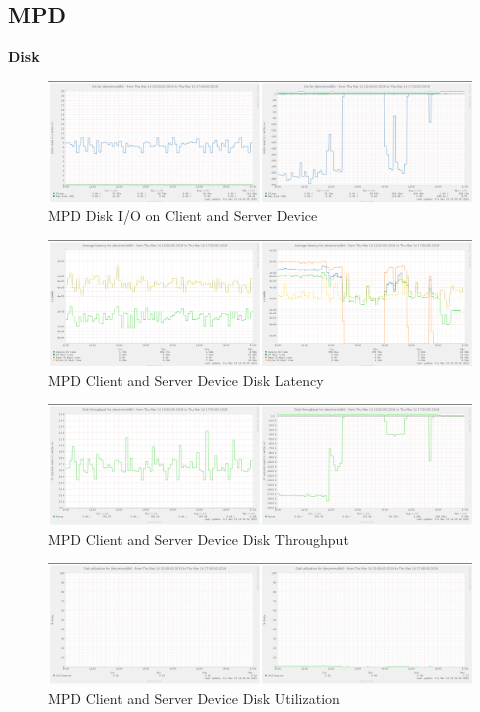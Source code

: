 \documentclass[11pt,a4paper]{scrreprt}
\begin{document}
\subsection{MPD}\label{mpd-2}

\textbf{Disk}

\begin{figure}[H]
\includegraphics{ResultsAndAnalysis/MPDServerTestImages/005MPDDiskIO.png}
\centering
\caption{MPD Disk I/O on Client and Server Device}
\label{MPDDiskIO}
\end{figure}

\begin{figure}[H]
\includegraphics{ResultsAndAnalysis/MPDServerTestImages/006MPDDiskLatency.png}
\centering
\caption{MPD Client and Server Device Disk Latency}
\label{MPDDiskLatency}
\end{figure}

\begin{figure}[H]
\includegraphics{ResultsAndAnalysis/MPDServerTestImages/007MPDDiskThroughput.png}
\centering
\caption{MPD Client and Server Device Disk Throughput}
\label{MPDDiskThroughput}
\end{figure}

\begin{figure}[H]
\includegraphics{ResultsAndAnalysis/MPDServerTestImages/008MPDDiskUtilization.png}
\centering
\caption{MPD Client and Server Device Disk Utilization}
\label{MPDDiskUtil}
\end{figure}
\end{document}
